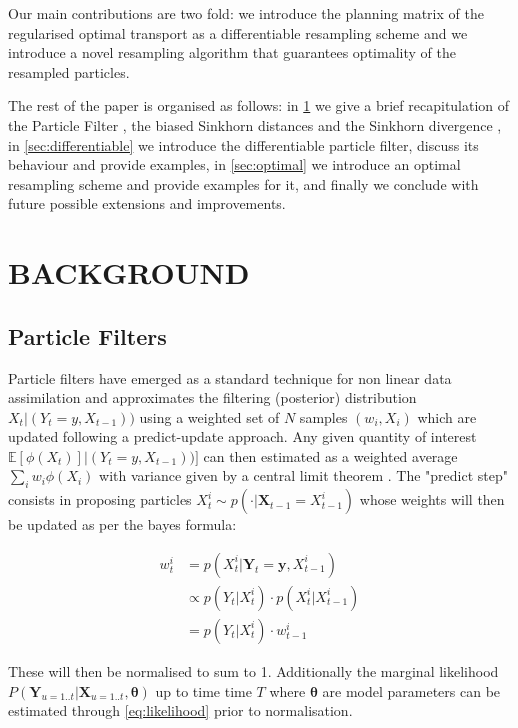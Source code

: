 \documentclass[]{article}
\begin{document}
	
	Our main contributions are two fold: we introduce the planning matrix of the regularised optimal transport as a differentiable resampling scheme and we introduce a novel resampling algorithm that guarantees optimality of the resampled particles.
	
	The rest of the paper is organised as follows: in \cref{sec:background} we give a brief recapitulation of the Particle Filter \parencite[][]{particlefilter}, the biased Sinkhorn distances \parencite[][]{cuturi2013sinkhorn} and the Sinkhorn divergence \parencite[][]{feydy:interpolating}, in \cref{sec:differentiable} we introduce the differentiable particle filter, discuss its behaviour and provide examples, in \cref{sec:optimal} we introduce an optimal resampling scheme and provide examples for it, and finally we conclude with future possible extensions and improvements.

\section{BACKGROUND}
\label{sec:background}
	\subsection{Particle Filters}
	\label{subsec:PF}
	 	
		Particle filters have emerged as a standard technique for non linear data assimilation and approximates the filtering (posterior) distribution $X_t|(Y_t=y, X_{t-1}))$ using a weighted set of $N$ samples $(w_i, X_i)$ which are updated following a predict-update approach. Any given quantity of interest $\mathbb{E}[\phi(X_t)]|(Y_t=y, X_{t-1}))]$ can then estimated as a weighted average $\sum_i w_i \phi(X_i)$ with variance given by a central limit theorem \parencite[see][]{chopin2004central}. 
		The "predict step" consists in proposing particles $X_t^i \sim p(\cdot|\mathbf{X}_{t-1}=X_{t-1}^i)$ whose weights will then be updated as per the bayes formula: 
		
		\begin{align}
			w_t^i &= p(X_t^i|\mathbf{Y}_t=\mathbf{y},X_{t-1}^i) \\
			&\propto p(Y_t|X_{t}^i) \cdot p(X_t^i|X_{t-1}^i) \label{eq:likelihood}\\
			&= p(Y_t|X_{t}^i) \cdot w_{t-1}^i
		\end{align}
	
		
		These will then be normalised to sum to 1. Additionally the marginal likelihood $P(\mathbf{Y}_{u=1..t}|\mathbf{X}_{u=1..t}, \mathbf{\theta})$ up to time time $T$ where $\mathbf{\theta}$ are model parameters can be estimated through \cref{eq:likelihood} prior to normalisation.
		
\end{document}
